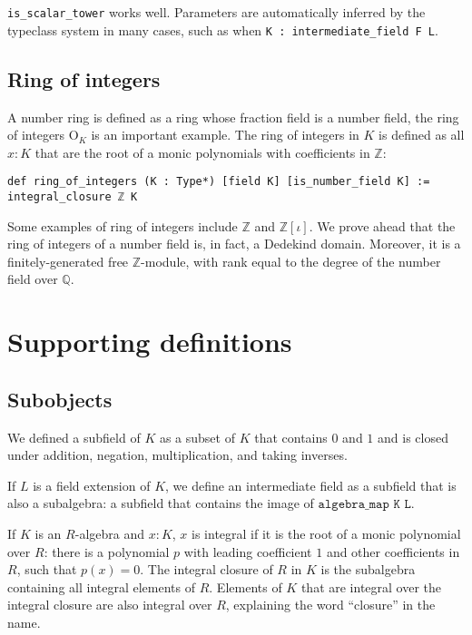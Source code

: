 \documentclass{lipics-v2021}
\newcommand{\lean}[1]{\texttt{#1}\xspace} %
\newcommand{\OK}{\mathrm{O}_K}
\newcommand{\Q}{\mathbb{Q}}
\newcommand{\Z}{\mathbb{Z}}
\begin{document}
\lean{is\_scalar\_tower} works well.
Parameters are automatically inferred by the typeclass system in many cases,
such as when \lean{K : intermediate\_field F L}.

\subsection{Ring of integers}

A number ring is defined as a ring whose fraction field is a number field, the ring of integers $\OK$ is an important example.
The ring of integers in $K$ is defined as all $x : K$ that are the root of a monic polynomials with coefficients in $\Z$:
\begin{lstlisting}
def ring_of_integers (K : Type*) [field K] [is_number_field K] :=
integral_closure ℤ K
\end{lstlisting}

Some examples of ring of integers include $\Z$ and $\Z[\iota]$. We prove ahead that the ring of integers of a number field is, in fact, a Dedekind domain. Moreover, it is a finitely-generated free $\Z$-module, with rank equal to the degree of the number field over $\Q$. 


\section{Supporting definitions}


\subsection{Subobjects}

We defined a subfield of $K$ as a subset of $K$ that contains $0$ and $1$ and is closed under addition, negation, multiplication, and taking inverses.

If $L$ is a field extension of $K$, we define an intermediate field as a subfield that is also a subalgebra: a subfield that contains the image of $\lean{algebra\_map K L}$.

If $K$ is an $R$-algebra and $x : K$, $x$ is integral if it is the root of a monic polynomial over $R$: there is a polynomial $p$ with leading coefficient $1$ and other coefficients in $R$, such that $p(x) = 0$.
The integral closure of $R$ in $K$ is the subalgebra containing all integral elements of $R$.
Elements of $K$ that are integral over the integral closure are also integral over $R$, explaining the word ``closure'' in the name.
\end{document}
